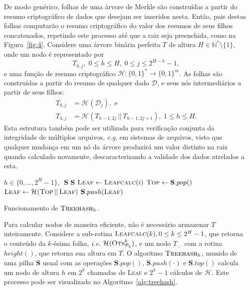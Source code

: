 \documentclass{ufsctex/ufsctex}
\newcommand{\hh}{\mathcal{H}}
\newcommand{\pk}{\mathcal{P}_{k}}
\newcommand{\hash}[2][]{\mathcal{H}^{#1} (#2)}
\newcommand{\concat}{\, \vert{} \vert{} \,}
\newcommand{\binwds}[1]{\{0, 1\}^{#1}}
\newcommand{\fhash}[1]{\hh{}: \binwds{*} \longrightarrow{} \binwds{#1}}
\begin{document}
De modo genérico, folhas de uma árvore de Merkle são construídas a partir do
resumo criptográfico de dados que desejam ser inseridos nesta. Então, pais
destas folhas computarão o resumo criptográfico do valor dos resumos de seus
filhos concatenados, repetindo este processo até que a raiz seja preenchida,
como na Figura~\ref{fig:4}. Considere uma árvore binária perfeita $T$ de altura
$H \in \mathbb{N}^{*}\setminus\{1\}$, onde um nodo é representado por
\begin{equation}
  T_{h, j}, \; 0 \leq h \leq H, \; 0 \leq j \leq 2^{H - h} - 1,
\end{equation}
e uma função de resumo criptográfico $\fhash{m}$. As folhas são construídas a
partir do resumo de qualquer dado $\mathcal{D}$, e seus nós intermediários a
partir de seus filhos:
\begin{equation}
  \begin{split}
    T_{0, j} &= \hash{\mathcal{D}_{j}}, \text{ e } \\
    T_{h, j} &= \hash{T_{h - 1, 2j} \concat T_{h - 1, 2j + 1}},
      \; 1 \leq h \leq H.
  \end{split}
\end{equation}
Esta estrutura também pode ser utilizada para verificação conjunta da
integridade de múltiplos arquivos, \emph{e.g.} em sistemas de arquivos, visto
que qualquer mudança em um nó da árvore produzirá um valor distinto na raiz
quando calculado novamente, descaracterizando a validade dos dados atrelados a
esta.

\begin{algorithm}
  \begin{algorithmic}
    \REQUIRE{}  $h \in \{0, \dots, 2^{H} - 1\}, \enspace \mathbf{S}$
    \ENSURE{}  $\mathbf{S}$ 
    \STATE{}  $\textsc{Leaf} \leftarrow \textsc{Leafcalc}(i)$
      \STATE{}  $\textsc{Top} \leftarrow \mathbf{S}.pop()$
      \STATE{}  $\textsc{Leaf} \leftarrow
        \hash{\textsc{Top} \concat \textsc{Leaf}}$
    \ENDWHILE{}
    \STATE{}  $\mathbf{S}.push(\textsc{Leaf})$
  \end{algorithmic}
  \caption{Funcionamento de $\textsc{Treehash}_{h}$.}\label{alg:treehash}
\end{algorithm}

Para calcular nodos de maneira eficiente, não é necessário armazenar $T$
inteiramente. Considere a sub-rotina $\textsc{Leafcalc}(k), 0 \leq k \leq 2^{H}
- 1$, que retorna o conteúdo da $k$-ésima folha, \emph{i.e.}
$\hash{\textsc{Ots}^{k}_{\pk{}}}$, e um nodo $T_{\cdot, \cdot}$ com a rotina
$height()$, que retorna sua altura em $T$. O algoritmo $\textsc{Treehash}_{h}$,
munido de uma pilha \textbf{S} usual com as operações $\mathbf{S}.pop()$,
$\mathbf{S}.push(\cdot)$ e $\mathbf{S}.top()$ calcula um nodo de altura $h$ em
$2^{h}$ chamadas de \textsc{Leaf} e $2^{h} - 1$ cálculos de $\hh{}$. Este
processo pode ser visualizado no Algoritmo~\ref{alg:treehash}.
\end{document}
